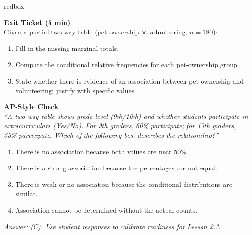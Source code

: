 \documentclass[10pt]{article}
\begin{document}
\begin{skillbox}{redbox}
\begin{minipage}[t]{0.48\linewidth}
    \textbf{Exit Ticket (5 min)}\\
    Given a partial two-way table (pet ownership $\times$ volunteering, $n = 180$):
    \begin{enumerate}
        \item Fill in the missing marginal totals.
        \item Compute the conditional relative frequencies for each pet-ownership group.
        \item State whether there is evidence of an association between pet ownership and
              volunteering; justify with specific values.
    \end{enumerate}
\end{minipage}
\hfill
\begin{minipage}[t]{0.48\linewidth}
    \textbf{AP-Style Check}\\
    \textit{``A two-way table shows grade level (9th/10th) and whether students participate
    in extracurriculars (Yes/No). For 9th graders, 60\% participate; for 10th graders, 55\%
    participate. Which of the following best describes the relationship?''}
    \begin{enumerate}[label=(\Alph*)]
        \item There is no association because both values are near 50\%.
        \item There is a strong association because the percentages are not equal.
        \item There is weak or no association because the conditional distributions are similar.
        \item Association cannot be determined without the actual counts.
    \end{enumerate}
    \textit{Answer: (C). Use student responses to calibrate readiness for Lesson 2.3.}
\end{minipage}
\end{skillbox}
\end{document}
